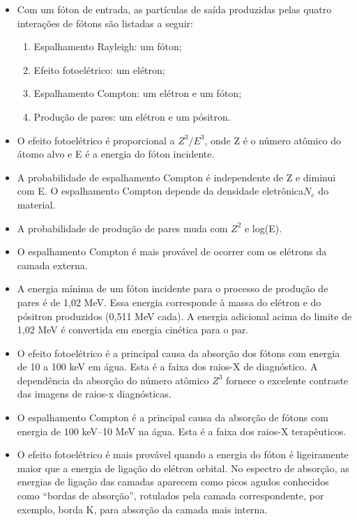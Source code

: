 \documentclass[11pt,a4paper]{article}
\newcounter{exemplo}
\begin{document}
\begin{exemplo}
\begin{itemize}
        \item Com um fóton de entrada, as partículas de saída produzidas pelas quatro interações de fótons são listadas a seguir:
            \begin{enumerate}[label=\roman*.]
                \item Espalhamento Rayleigh: um fóton;
                \item Efeito fotoelétrico: um elétron;
                \item Espalhamento Compton: um elétron e um fóton;
                \item Produção de pares: um elétron e um pósitron.
            \end{enumerate}

        \item O efeito fotoelétrico é proporcional a $Z^3/E^3$, onde Z é o número atômico do átomo alvo e E é a energia do fóton incidente.
        
        \item A probabilidade de espalhamento Compton é independente de Z e diminui com E. O espalhamento Compton depende da densidade eletrônica$N_e$ do material.
        
        \item A probabilidade de produção de pares muda com $Z^2$ e log(E).
        
        \item O espalhamento Compton é mais provável de ocorrer com os elétrons da camada externa.
        
        \item A energia mínima de um fóton incidente para o processo de produção de pares é de 1,02 MeV. Essa energia corresponde à massa do elétron e do pósitron produzidos (0,511 MeV cada). A energia adicional acima do limite de 1,02 MeV é convertida em energia cinética para o par.
        
        \item O efeito fotoelétrico é a principal causa da absorção dos fótons com energia de 10 a 100 keV em água. Esta é a faixa dos raios-X de diagnóstico. A dependência da absorção do número atômico $Z^3$ fornece o excelente contraste das imagens de raios-x diagnósticas.
        
        \item O espalhamento Compton é a principal causa da absorção de fótons com energia de 100 keV–10 MeV na água. Esta é a faixa dos raios-X terapêuticos.
        
        \item O efeito fotoelétrico é mais provável quando a energia do fóton é ligeiramente maior que a energia de ligação do elétron orbital. No espectro de absorção, as energias de ligação das camadas aparecem como picos agudos conhecidos como “bordas de absorção”, rotulados pela camada correspondente, por exemplo, borda K, para absorção da camada mais interna.
        

\end{itemize}
\end{exemplo}
\end{document}
